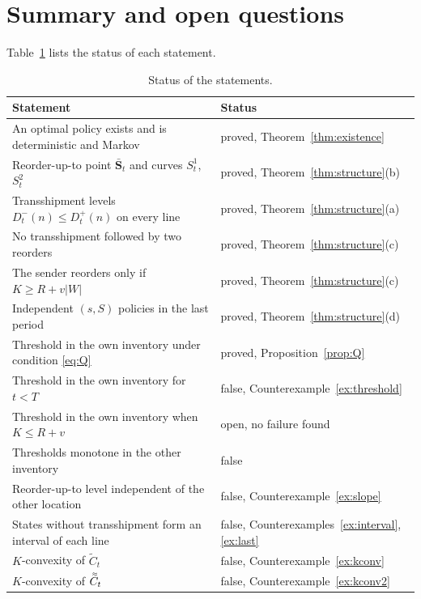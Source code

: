 \documentclass[11pt]{article}
\DeclareRobustCommand{\dbtilde}[1]{\accentset{\approx}{#1}}
\renewcommand{\vec}[1]{\boldsymbol{#1}}
\newcommand{\Ct}{\widetilde{C}}
\newcommand{\Cq}{\dbtilde{C}}
\theoremstyle{definition}
\begin{document}
\section{Summary and open questions}

Table~\ref{tab:status} lists the status of each statement.

\begin{table}[h]
\centering
\small
\caption{Status of the statements.}\label{tab:status}
\begin{tabular}{p{8.9cm}l}
\toprule
Statement & Status \\
\midrule
An optimal policy exists and is deterministic and Markov & proved, Theorem~\ref{thm:existence} \\
Reorder-up-to point $\bar{\vec{S}}_t$ and curves $S^1_t$, $S^2_t$ & proved, Theorem~\ref{thm:structure}(b) \\
Transshipment levels $D^-_t(n)\le D^+_t(n)$ on every line & proved, Theorem~\ref{thm:structure}(a) \\
No transshipment followed by two reorders & proved, Theorem~\ref{thm:structure}(c) \\
The sender reorders only if $K\ge R+v|W|$ & proved, Theorem~\ref{thm:structure}(c) \\
Independent $(s,S)$ policies in the last period & proved, Theorem~\ref{thm:structure}(d) \\
Threshold in the own inventory under condition \eqref{eq:Q} & proved, Proposition~\ref{prop:Q} \\
Threshold in the own inventory for $t<T$ & false, Counterexample~\ref{ex:threshold} \\
Threshold in the own inventory when $K\le R+v$ & open, no failure found \\
Thresholds monotone in the other inventory & false \\
Reorder-up-to level independent of the other location & false, Counterexample~\ref{ex:slope} \\
States without transshipment form an interval of each line & false, Counterexamples~\ref{ex:interval}, \ref{ex:last} \\
$K$-convexity of $\Ct_t$ & false, Counterexample~\ref{ex:kconv} \\
$K$-convexity of $\Cq_t$ & false, Counterexample~\ref{ex:kconv2} \\
\bottomrule
\end{tabular}
\end{table}
\end{document}
